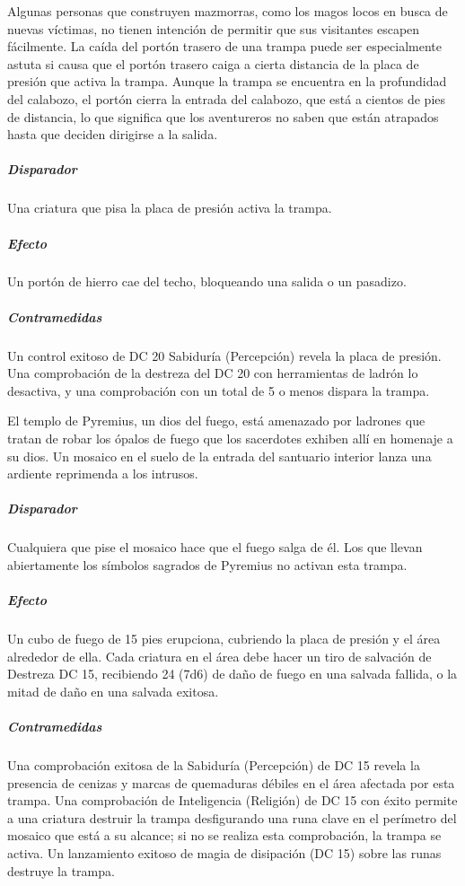 \documentclass[a4paper,twocolumn,openany,10pt]{dndbook}
\begin{document}
Algunas personas que construyen mazmorras, como los magos locos en busca de nuevas víctimas, no tienen intención de permitir que
sus visitantes escapen fácilmente. La caída del portón trasero de una trampa puede ser especialmente astuta si causa que el
portón trasero caiga a cierta distancia de la placa de presión que activa la trampa. Aunque la trampa se encuentra en la
profundidad del calabozo, el portón cierra la entrada del calabozo, que está a cientos de pies de distancia, lo que significa
que los aventureros no saben que están atrapados hasta que deciden dirigirse a la salida.

\subparagraph{Disparador} Una criatura que pisa la placa de presión activa la trampa.

\subparagraph{Efecto} Un portón de hierro cae del techo, bloqueando una salida o un pasadizo.

\subparagraph{Contramedidas} Un control exitoso de DC 20 Sabiduría (Percepción) revela la placa de presión. Una comprobación de
la destreza del DC 20 con herramientas de ladrón lo desactiva, y una comprobación con un total de 5 o menos dispara la trampa. 

El templo de Pyremius, un dios del fuego, está amenazado por ladrones que tratan de robar los ópalos de fuego que los sacerdotes
exhiben allí en homenaje a su dios. Un mosaico en el suelo de la entrada del santuario interior lanza una ardiente reprimenda a
los intrusos.

\subparagraph{Disparador} Cualquiera que pise el mosaico hace que el fuego salga de él. Los que llevan abiertamente los símbolos
sagrados de Pyremius no activan esta trampa.

\subparagraph{Efecto} Un cubo de fuego de 15 pies erupciona, cubriendo la placa de presión y el área alrededor de ella. Cada
criatura en el área debe hacer un tiro de salvación de Destreza DC 15, recibiendo 24 (7d6) de daño de fuego en una salvada
fallida, o la mitad de daño en una salvada exitosa.

\subparagraph{Contramedidas} Una comprobación exitosa de la Sabiduría (Percepción) de DC 15 revela la presencia de cenizas y
marcas de quemaduras débiles en el área afectada por esta trampa. Una comprobación de Inteligencia (Religión) de DC 15 con éxito
permite a una criatura destruir la trampa desfigurando una runa clave en el perímetro del mosaico que está a su alcance; si no se
realiza esta comprobación, la trampa se activa. Un lanzamiento exitoso de magia de disipación (DC 15) sobre las runas destruye la
trampa.
\end{document}
